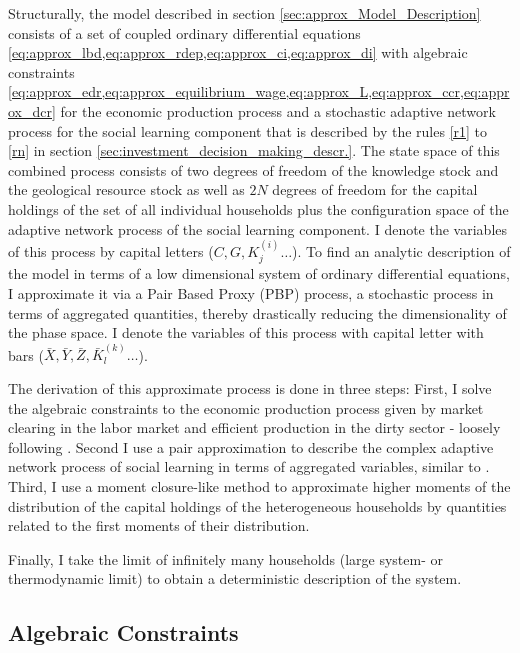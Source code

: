 Structurally, the model described in section \ref{sec:approx_Model_Description} consists of a set of coupled ordinary differential equations \cref{eq:approx_lbd,eq:approx_rdep,eq:approx_ci,eq:approx_di} with algebraic constraints \cref{eq:approx_edr,eq:approx_equilibrium_wage,eq:approx_L,eq:approx_ccr,eq:approx_dcr} for the economic production process and a stochastic adaptive network process for the social learning component that is described by the rules \ref{r1} to \ref{rn} in section \ref{sec:investment_decision_making_descr.}. The state space of this combined process consists of two degrees of freedom of the knowledge stock and the geological resource stock as well as $2N$ degrees of freedom for the capital holdings of the set of all individual households plus the configuration space of the adaptive network process of the social learning component. I denote the variables of this process by capital letters ($C, G, K_j^{(i)}\dots$).
To find an analytic description of the model in terms of a low dimensional system of ordinary differential equations, I approximate it via a Pair Based Proxy (PBP) process, a stochastic process in terms of aggregated quantities, thereby drastically reducing the dimensionality of the phase space. I denote the variables of this process with capital letter with bars ($\bar{X}, \bar{Y}, \bar{Z}, \bar{K}_l^{(k)}\dots$).

The derivation of this approximate process is done in three steps: First, I solve the algebraic constraints to the economic production process given by market clearing in the labor market and efficient production in the dirty sector - loosely following \cite{Nitzbon2017}. Second I use a pair approximation to describe the complex adaptive network process of social learning in terms of aggregated variables, similar to \cite{Rogers2012}. Third, I use a moment closure-like method to approximate higher moments of the distribution of the capital holdings of the heterogeneous households by quantities related to the first moments of their distribution.

Finally, I take the limit of infinitely many households (large system- or thermodynamic limit) to obtain a deterministic description of the system.

\subsection{Algebraic Constraints}

